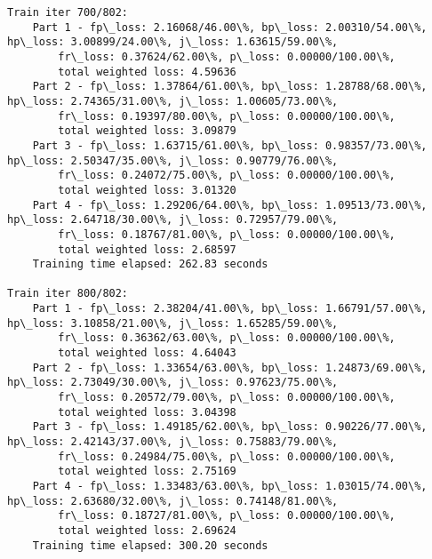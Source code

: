 \documentclass[11pt]{article}
\begin{document}
\begin{Verbatim}[commandchars=\\\{\}]
Train iter 700/802:
	Part 1 - fp\_loss: 2.16068/46.00\%, bp\_loss: 2.00310/54.00\%, hp\_loss: 3.00899/24.00\%, j\_loss: 1.63615/59.00\%, 
		fr\_loss: 0.37624/62.00\%, p\_loss: 0.00000/100.00\%, 
		total weighted loss: 4.59636
	Part 2 - fp\_loss: 1.37864/61.00\%, bp\_loss: 1.28788/68.00\%, hp\_loss: 2.74365/31.00\%, j\_loss: 1.00605/73.00\%, 
		fr\_loss: 0.19397/80.00\%, p\_loss: 0.00000/100.00\%, 
		total weighted loss: 3.09879
	Part 3 - fp\_loss: 1.63715/61.00\%, bp\_loss: 0.98357/73.00\%, hp\_loss: 2.50347/35.00\%, j\_loss: 0.90779/76.00\%, 
		fr\_loss: 0.24072/75.00\%, p\_loss: 0.00000/100.00\%, 
		total weighted loss: 3.01320
	Part 4 - fp\_loss: 1.29206/64.00\%, bp\_loss: 1.09513/73.00\%, hp\_loss: 2.64718/30.00\%, j\_loss: 0.72957/79.00\%, 
		fr\_loss: 0.18767/81.00\%, p\_loss: 0.00000/100.00\%, 
		total weighted loss: 2.68597
	Training time elapsed: 262.83 seconds

Train iter 800/802:
	Part 1 - fp\_loss: 2.38204/41.00\%, bp\_loss: 1.66791/57.00\%, hp\_loss: 3.10858/21.00\%, j\_loss: 1.65285/59.00\%, 
		fr\_loss: 0.36362/63.00\%, p\_loss: 0.00000/100.00\%, 
		total weighted loss: 4.64043
	Part 2 - fp\_loss: 1.33654/63.00\%, bp\_loss: 1.24873/69.00\%, hp\_loss: 2.73049/30.00\%, j\_loss: 0.97623/75.00\%, 
		fr\_loss: 0.20572/79.00\%, p\_loss: 0.00000/100.00\%, 
		total weighted loss: 3.04398
	Part 3 - fp\_loss: 1.49185/62.00\%, bp\_loss: 0.90226/77.00\%, hp\_loss: 2.42143/37.00\%, j\_loss: 0.75883/79.00\%, 
		fr\_loss: 0.24984/75.00\%, p\_loss: 0.00000/100.00\%, 
		total weighted loss: 2.75169
	Part 4 - fp\_loss: 1.33483/63.00\%, bp\_loss: 1.03015/74.00\%, hp\_loss: 2.63680/32.00\%, j\_loss: 0.74148/81.00\%, 
		fr\_loss: 0.18727/81.00\%, p\_loss: 0.00000/100.00\%, 
		total weighted loss: 2.69624
	Training time elapsed: 300.20 seconds


\end{Verbatim}
\end{document}
